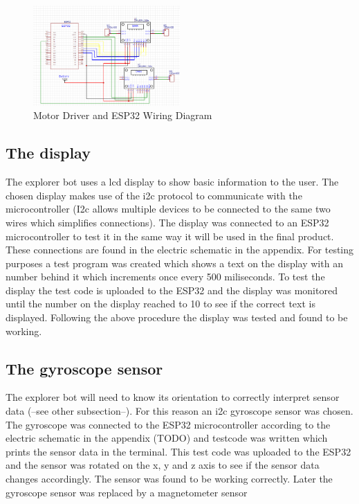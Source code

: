 \begin{figure}[h]
    \centering
    \caption{Motor Driver and ESP32 Wiring Diagram}
    \label{fig:motoropstelling}
    \includegraphics[width=0.5\textwidth]{motoropstelling.png}
\end{figure}



\subsection{The display}
The explorer bot uses a lcd display to show basic information to the 
user. The chosen display makes use of the i2c protocol to communicate 
with the microcontroller (I2c allows multiple devices to be connected to
the same two wires which simplifies connections). 
The display was connected to an ESP32 microcontroller to test it in the 
same way it will be used in the final product. These connections are found 
in the electric schematic in the appendix. For testing purposes a test 
program was 
created which shows a text on the display with an number behind it which 
increments once every 500 miliseconds.
To test the display the test code is uploaded to the ESP32 and the display was
monitored until the number on the display reached to 10 to see if the correct text is displayed.  %
Following the above procedure the display was tested and found to be working. 

\subsection{The gyroscope sensor}
The explorer bot will need to know its orientation to correctly interpret 
sensor data (--see other subsection--). For this reason an i2c gyroscope 
sensor was chosen. The gyroscope was connected to the ESP32 microcontroller 
according to the electric schematic in the appendix (TODO) and testcode was 
written which prints the sensor data in the terminal. This test code was 
uploaded to the ESP32 and the sensor was rotated on the x, y and z axis to 
see if the sensor data changes accordingly. The sensor was found to 
be working correctly.
Later the gyroscope sensor was replaced by a magnetometer sensor

